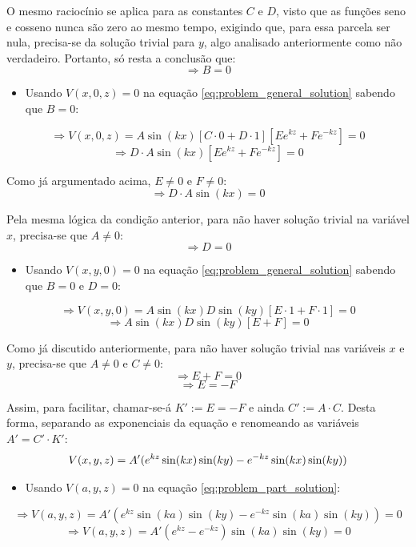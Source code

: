 \documentclass{report}
\begin{document}
O mesmo raciocínio se aplica para as constantes $ C $ e $ D $, visto que as funções seno e cosseno nunca são zero
ao mesmo tempo, exigindo que, para essa parcela ser nula, precisa-se da solução trivial para $ y $, algo analisado
anteriormente como não verdadeiro. Portanto, só resta a conclusão que:
$$ \Rightarrow B = 0 $$

\begin{itemize}
  \item Usando $ V(x, 0, z) = 0 $ na equação \ref{eq:problem_general_solution} sabendo que $ B = 0 $:
\end{itemize}
$$ \Rightarrow V(x, 0, z) = A\sin(kx)[C\cdot 0 + D\cdot 1][Ee^{kz} + Fe^{-kz}] = 0 $$
$$ \Rightarrow D\cdot A\sin(kx)[Ee^{kz} + Fe^{-kz}] = 0 $$

Como já argumentado acima, $ E \neq 0 $ e $ F \neq 0 $:
$$ \Rightarrow D\cdot A\sin(kx) = 0 $$

Pela mesma lógica da condição anterior, para não haver solução trivial na variável $ x $, precisa-se que $ A \neq 0 $:
$$ \Rightarrow D = 0 $$

\begin{itemize}
  \item Usando $ V(x, y, 0) = 0 $ na equação \ref{eq:problem_general_solution} sabendo que $ B = 0 $ e $ D = 0 $:
\end{itemize}
$$ \Rightarrow V(x, y, 0) = A\sin(kx)D\sin(ky)[E\cdot 1 + F\cdot 1] = 0 $$
$$ \Rightarrow A\sin(kx)D\sin(ky)[E + F] = 0 $$

Como já discutido anteriormente, para não haver solução trivial nas variáveis $ x $ e $ y $, precisa-se que $ A \neq 0 $ e $ C \neq 0 $:
$$ \Rightarrow E + F = 0 $$
$$ \Rightarrow E = -F $$

Assim, para facilitar, chamar-se-á $ K' := E = -F $ e ainda $ C' := A\cdot C $. Desta forma, separando as exponenciais da equação e renomeando
as variáveis $ A' = C'\cdot K' $:
\begin{equation}
    \label{eq:problem_part_solution}
    \centering
    V(x, y, z) = A'(e^{kz}\sin(kx)\sin(ky) - e^{-kz}\sin(kx)\sin(ky))
\end{equation}

\begin{itemize}
  \item Usando $ V(a, y, z) = 0 $ na equação \ref{eq:problem_part_solution}:
\end{itemize}
$$ \Rightarrow V(a, y, z) = A'(e^{kz}\sin(ka)\sin(ky) - e^{-kz}\sin(ka)\sin(ky)) = 0 $$
$$ \Rightarrow V(a, y, z) = A'(e^{kz} - e^{-kz})\sin(ka)\sin(ky) = 0 $$
\end{document}

